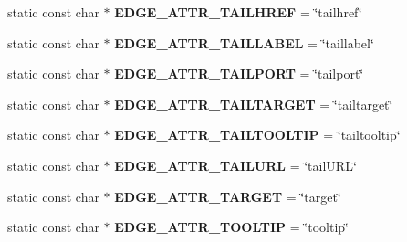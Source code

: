 \begin{DoxyCompactItemize}
\item 
static const char $\ast$ {\bfseries E\+D\+G\+E\+\_\+\+A\+T\+T\+R\+\_\+\+T\+A\+I\+L\+H\+R\+EF} = \char`\"{}tailhref\char`\"{}\hypertarget{classmemgraph_1_1_graphviz_attrs_a9c75cb1ccb72ac448b577c58cd18b24e}{}\label{classmemgraph_1_1_graphviz_attrs_a9c75cb1ccb72ac448b577c58cd18b24e}

\item 
static const char $\ast$ {\bfseries E\+D\+G\+E\+\_\+\+A\+T\+T\+R\+\_\+\+T\+A\+I\+L\+L\+A\+B\+EL} = \char`\"{}taillabel\char`\"{}\hypertarget{classmemgraph_1_1_graphviz_attrs_a0614c86b46f5d9c9ebb2f5e7818de361}{}\label{classmemgraph_1_1_graphviz_attrs_a0614c86b46f5d9c9ebb2f5e7818de361}

\item 
static const char $\ast$ {\bfseries E\+D\+G\+E\+\_\+\+A\+T\+T\+R\+\_\+\+T\+A\+I\+L\+P\+O\+RT} = \char`\"{}tailport\char`\"{}\hypertarget{classmemgraph_1_1_graphviz_attrs_ade4126261de08f5c15d49cb37ae0d257}{}\label{classmemgraph_1_1_graphviz_attrs_ade4126261de08f5c15d49cb37ae0d257}

\item 
static const char $\ast$ {\bfseries E\+D\+G\+E\+\_\+\+A\+T\+T\+R\+\_\+\+T\+A\+I\+L\+T\+A\+R\+G\+ET} = \char`\"{}tailtarget\char`\"{}\hypertarget{classmemgraph_1_1_graphviz_attrs_a305d20d6b42084ad82057971e2c58534}{}\label{classmemgraph_1_1_graphviz_attrs_a305d20d6b42084ad82057971e2c58534}

\item 
static const char $\ast$ {\bfseries E\+D\+G\+E\+\_\+\+A\+T\+T\+R\+\_\+\+T\+A\+I\+L\+T\+O\+O\+L\+T\+IP} = \char`\"{}tailtooltip\char`\"{}\hypertarget{classmemgraph_1_1_graphviz_attrs_a03806dad0bd0f5c54ce891e891e17108}{}\label{classmemgraph_1_1_graphviz_attrs_a03806dad0bd0f5c54ce891e891e17108}

\item 
static const char $\ast$ {\bfseries E\+D\+G\+E\+\_\+\+A\+T\+T\+R\+\_\+\+T\+A\+I\+L\+U\+RL} = \char`\"{}tail\+U\+RL\char`\"{}\hypertarget{classmemgraph_1_1_graphviz_attrs_a269c320e85b387f6db01e8839b3c886c}{}\label{classmemgraph_1_1_graphviz_attrs_a269c320e85b387f6db01e8839b3c886c}

\item 
static const char $\ast$ {\bfseries E\+D\+G\+E\+\_\+\+A\+T\+T\+R\+\_\+\+T\+A\+R\+G\+ET} = \char`\"{}target\char`\"{}\hypertarget{classmemgraph_1_1_graphviz_attrs_a407167d6613e98fbd4dc95347edf565c}{}\label{classmemgraph_1_1_graphviz_attrs_a407167d6613e98fbd4dc95347edf565c}

\item 
static const char $\ast$ {\bfseries E\+D\+G\+E\+\_\+\+A\+T\+T\+R\+\_\+\+T\+O\+O\+L\+T\+IP} = \char`\"{}tooltip\char`\"{}\hypertarget{classmemgraph_1_1_graphviz_attrs_a7bacd8b8db56fac8e62ecf5cea0b791d}{}\label{classmemgraph_1_1_graphviz_attrs_a7bacd8b8db56fac8e62ecf5cea0b791d}


\end{DoxyCompactItemize}
